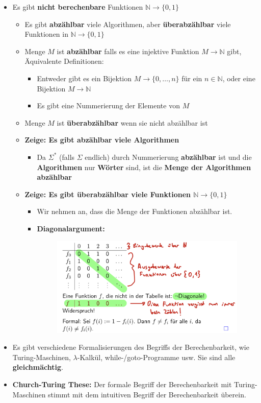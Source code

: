 \documentclass[ieeetran]{article}
\begin{document}
\begin{itemize}
\item Es gibt \textbf{nicht berechenbare} Funktionen $\mathbb{N} \rightarrow \{0,1\}$
	\begin{itemize}
		\item Es gibt \textbf{abzählbar} viele Algorithmen, aber \textbf{überabzählbar} viele Funktionen in $\mathbb{N} \rightarrow \{0,1\}$


\item Menge $M$ ist \textbf{abzählbar} falls es eine injektive Funktion $M \rightarrow \mathbb{N}$ gibt, Äquivalente Definitionen:
	\begin{itemize}
		\item Entweder gibt es ein Bijektion $M \rightarrow \{0, \ldots, n\}$ für ein $n \in \mathbb{N}$, oder eine Bijektion $M \rightarrow \mathbb{N}$
		\item Es gibt eine Nummerierung der Elemente von $M$
	\end{itemize}

\item Menge $M$ ist \textbf{überabzählbar} wenn sie nicht abzählbar ist

\item \textbf{Zeige: Es gibt abzählbar viele Algorithmen}
	\begin{itemize}
\item Da $\Sigma^*$ (falls $\Sigma$ endlich) durch Nummerierung \textbf{abzählbar} ist und die \textbf{Algorithmen} nur \textbf{Wörter} sind, ist die  \textbf{Menge der Algorithmen abzählbar}
	\end{itemize}

\item \textbf{Zeige: Es gibt überabzählbar viele Funktionen $\mathbb{N} \rightarrow \{0,1\}$}
	\begin{itemize}
		\item Wir nehmen an, dass die Menge der Funktionen abzählbar ist.
		\item \textbf{Diagonalargument:}
			\begin{figure}[h!]
			  \centering
			  \includegraphics[width=0.6\linewidth]{diagonal}
			  \label{fig:diagonal}
			\end{figure}
	\end{itemize}
\end{itemize}

\item Es gibt verschiedene Formalisierungen des Begriffs der Berechenbarkeit, wie Turing-Maschinen, $\lambda$-Kalkül, while-/goto-Programme usw. Sie sind alle \textbf{gleichmächtig}.

\item \textbf{Church-Turing These:} Der formale Begriff der Berechenbarkeit mit Turing-Maschinen stimmt mit dem intuitiven Begriff der Berechenbarkeit überein.
\end{itemize}
\end{document}
